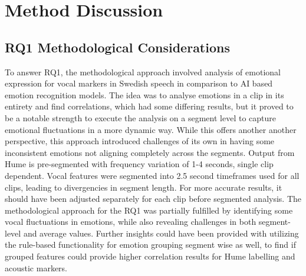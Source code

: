 \section{Method Discussion}
\subsection{RQ1 Methodological Considerations}
To answer RQ1, the methodological approach involved analysis of emotional expression for
vocal markers in Swedish speech in comparison to AI based emotion recognition models. The
idea was to analyse emotions in a clip in its entirety and find correlations, which had some
differing results, but it proved to be a notable strength to execute the analysis on a segment
level to capture emotional fluctuations in a more dynamic way. While this offers another
another perspective, this approach introduced challenges of its own in having some inconsistent
emotions not aligning completely across the segments. Output from Hume is pre-segmented with frequency variation of 1-4 seconds, single clip dependent. Vocal features were segmented into 2.5 second timeframes used for all clips, leading to divergencies in segment length. For more accurate results, it should have been adjusted separately for each clip before segmented analysis. The methodological approach for the RQ1 was partially fulfilled by identifying some vocal fluctuations in emotions, while also revealing challenges in both segment-level and average values. Further insights could have been provided with utilizing the rule-based functionality for emotion grouping segment wise as well, to find if grouped features could provide higher correlation results for Hume labelling and acoustic markers. 

